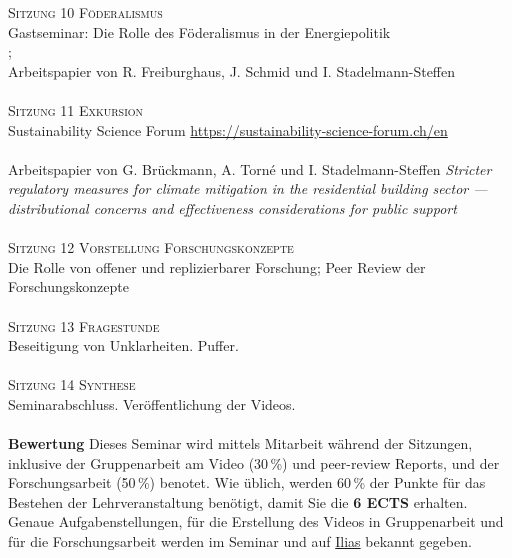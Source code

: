 \documentclass[12pt,a4paper]{article}
\begin{document}
\textsc{Sitzung 10 \dotfill Föderalismus} \smallskip \\ 
{\color{darkgreen}{\Rectangle}} Gastseminar: Die Rolle des Föderalismus in der Energiepolitik\\
{\color{darkgreen}{\Rectangle}} ; \\ {\color{darkgreen}{\Rectangle}} Arbeitspapier von R. Freiburghaus, J. Schmid und I. Stadelmann-Steffen\\
\medskip  \\	

\textsc{Sitzung 11 \dotfill Exkursion} \smallskip \\ 
{\color{darkgreen}{\Rectangle}} Sustainability Science Forum \url{https://sustainability-science-forum.ch/en} \\
{\color{darkgreen}{\Rectangle}}  \\
{\color{darkgreen}{\Rectangle}} Arbeitspapier von G. Brückmann, A. Torné und I. Stadelmann-Steffen \textit{Stricter regulatory measures for climate mitigation in the residential building sector — distributional concerns and effectiveness considerations for public support}\\
\medskip  \\	

\textsc{Sitzung 12 \dotfill Vorstellung Forschungskonzepte} \smallskip \\ 
{\color{darkgreen}{\Rectangle}} Die Rolle von offener und replizierbarer Forschung; Peer Review der Forschungskonzepte\\
\medskip  \\	


\textsc{Sitzung 13 \dotfill Fragestunde} \smallskip \\ 
{\color{darkgreen}{\Rectangle}} Beseitigung von Unklarheiten. Puffer. \\  \medskip  \\	

\textsc{Sitzung 14 \dotfill Synthese}  \smallskip \\ 
{\color{darkgreen}{\Rectangle}} Seminarabschluss. Veröffentlichung der Videos.\\
\medskip  \\	


\noindent\textbf{Bewertung}
Dieses Seminar wird mittels Mitarbeit während der Sitzungen, inklusive der Gruppenarbeit am Video (30\,\%) und peer-review Reports, und der Forschungsarbeit (50\,\%) benotet. Wie üblich, werden 60\,\% der Punkte für das Bestehen der Lehrveranstaltung benötigt, damit Sie die \textbf{6 ECTS} erhalten.\\
Genaue Aufgabenstellungen, für die Erstellung des Videos in Gruppenarbeit und für die Forschungsarbeit werden im Seminar und auf \href{https://ilias.unibe.ch/goto_ilias3_unibe_crs_3414477.html}{Ilias} bekannt gegeben.\\ 
\end{document}
